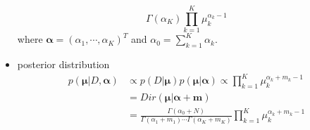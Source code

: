 \documentclass[12pt, a4paper]{article}
\begin{document}
\begin{itemize}
\begin{equation*}
{            \Gamma(\alpha_K)}\prod_{k=1}^K\mu_k^{\alpha_k-1}
        \end{equation*}
        where $\bm{\alpha}=(\alpha_1,\cdots,\alpha_K)^T$ and $\alpha_0=\sum_{k=1}^K
        \alpha_k$.
        \item posterior distribution
        \begin{align*}
            p(\bm{\mu}|D,\bm{\alpha})&\propto p(D|\bm{\mu})p(\bm{\mu}|\bm{\alpha})
            \propto \prod_{k=1}^K\mu_k^{\alpha_k+m_k-1}\\
            &=Dir(\bm{\mu}|\bm{\alpha}+\bm{m})\\
            &=\frac{\Gamma(\alpha_0+N)}{\Gamma(\alpha_1+m_1)\cdots
            \Gamma(\alpha_K+m_K)}\prod_{k=1}^K\mu_k^{\alpha_k+m_k-1}
        \end{align*}
    \end{itemize}
\end{document}
